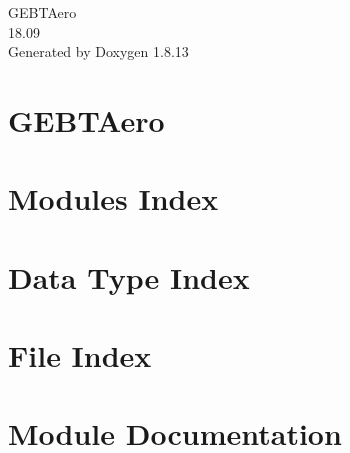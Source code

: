 \documentclass[twoside]{book}
\newcommand{\+}{\discretionary{\mbox{\scriptsize$\hookleftarrow$}}{}{}}
\newcommand{\clearemptydoublepage}{%
  \newpage{\pagestyle{empty}\cleardoublepage}%
}
\begin{document}
\hypersetup{pageanchor=false,
             bookmarksnumbered=true,
             pdfencoding=unicode
            }
\begin{titlepage}
\vspace*{7cm}
\begin{center}%
{\Large G\+E\+B\+T\+Aero \\[1ex]\large 18.\+09 }\\
\vspace*{1cm}
{\large Generated by Doxygen 1.8.13}\\
\end{center}
\end{titlepage}
\clearemptydoublepage
{}
\tableofcontents
\clearemptydoublepage
{}
\hypersetup{pageanchor=true}

\chapter{G\+E\+B\+T\+Aero}
\label{index}\hypertarget{index}{}
\chapter{Modules Index}

\chapter{Data Type Index}

\chapter{File Index}

\chapter{Module Documentation}





























\end{document}
